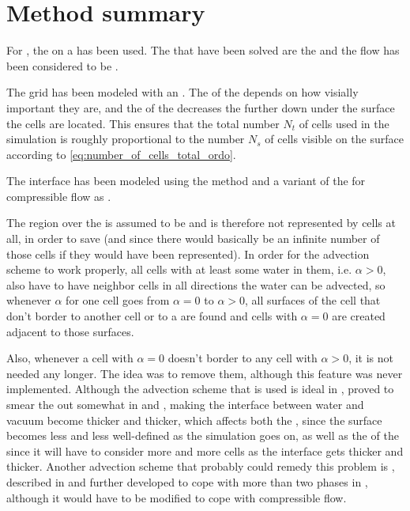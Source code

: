 \chapter{Method summary}

For \thisprojectwork, the \FVM on a  has been used. The \PDEs that have been solved are the  and the flow has been considered to be .

The grid has been modeled with an \octree. The \LOD of the  depends on how visially important they are, and the \LOD of the  decreases the further down under the surface the cells are located. This  ensures that the total number $N_t$ of cells used in the simulation is roughly proportional to the number $N_s$ of cells visible on the surface according to \eqref{eq:number_of_cells_total_ordo}.

The interface has been modeled using the \VOF method and a variant of the  for compressible flow as .

The region over the  is assumed to be \vacuum and is therefore not represented by cells at all, in order to save  (and since there would basically be an infinite number of those cells if they would have been represented). In order for the advection scheme to work properly, all cells with at least some water in them, i.e. $\alpha > 0$, also have to have neighbor cells in all directions the water can be advected, so whenever $\alpha$ for one cell goes from $\alpha = 0$ to $\alpha > 0$, all surfaces of the cell that don't border to another cell or to a  are found and cells with $\alpha = 0$ are created adjacent to those surfaces.

Also, whenever a cell with $\alpha = 0$ doesn't border to any cell with $\alpha > 0$, it is not needed any longer. The idea was to remove them, although this feature was never implemented. Although the advection scheme that is used is ideal in , proved to smear the  out somewhat in  and , making the interface between water and vacuum become thicker and thicker, which affects both the , since the surface becomes less and less well-defined as the simulation goes on, as well as the \preformance of the  since it will have to consider more and more cells as the interface gets thicker and thicker. Another advection scheme that probably could remedy this problem is \MULES, described in \citep{Berberovi2009} and further developed to cope with more than two phases in \citep{Kissling2010}, although it would have to be modified to cope with compressible flow.

